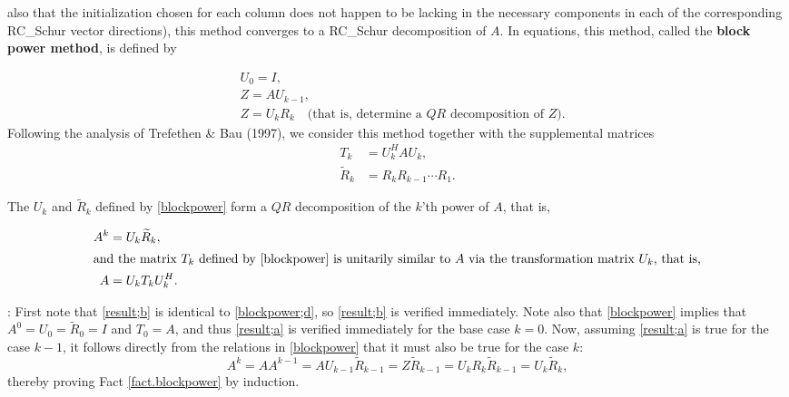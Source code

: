 also that the initialization chosen
for each column does not happen to be lacking in the necessary components in each of the corresponding RC_Schur vector
directions),
this method converges to a RC_Schur decomposition of $A$.  In equations, this method,
called the {\bf block power method}, is defined by
\begin{subeqnA}
\label{blockpower}
\begin{align}
& {U}_{0}=I, \label{blockpower;a}\\
& Z=A{U}_{k-1}, \label{blockpower;b}\\
& Z={U}_{k} {R}_{k} \quad \textrm{(that is, determine a $QR$ decomposition of $Z$)}.\label{blockpower;c}
\end{align}
Following the analysis of Trefethen \& Bau (1997), we consider this method together with the supplemental matrices
\begin{align}
T_{k}&={U}_{k}^H A {U}_{k},\label{blockpower;d}\\
{\widetilde R}_{k}&=R_{k} R_{k-1} \cdots R_{1}.  \label{blockpower;e}
\end{align}
\end{subeqnA}

\begin{fact} \label{fact.blockpower}
The ${U}_{k}$ and ${\widetilde R}_{k}$ defined by \eqref{blockpower}
form a $QR$ decomposition of the $k$'th power of $A$, that is,
\begin{subeqnA}
\label{result}
\begin{align}
A^k &= {U}_{k} {\widetilde R}_{k}, \label{result;a} \\
\intertext{and the matrix $T_{k}$ defined by \eqref{blockpower} is
unitarily similar to $A$ via the transformation matrix ${U}_{k}$, that is,}
A &= {U}_{k} T_{k} {U}_{k}^H. \label{result;b}
\end{align}
\end{subeqnA}
\end{fact}
\enlargethispage{3pt}

\/: 
First note that \eqref{result;b} is identical to \eqref{blockpower;d}, so \eqref{result;b} is verified immediately.  Note also
that \eqref{blockpower} implies that $A^0={U}_{0}={\widetilde R}_{0}=I$ and $T_{0}=A$, and thus \eqref{result;a}
is verified immediately for the base case $k=0$.  Now, assuming \eqref{result;a} is true for the case $k-1$,
it follows directly from the relations in \eqref{blockpower} that it must also be true for the case $k$:
\begin{equation*}
   A^k = A A^{k-1} = A {U}_{k-1} {\widetilde R}_{k-1} = Z {\widetilde R}_{k-1}
   = {U}_{k} {R}_{k} {\widetilde R}_{k-1} = {U}_{k} {\widetilde R}_{k},
\end{equation*}
thereby proving Fact \ref{fact.blockpower} by induction. \endproof

